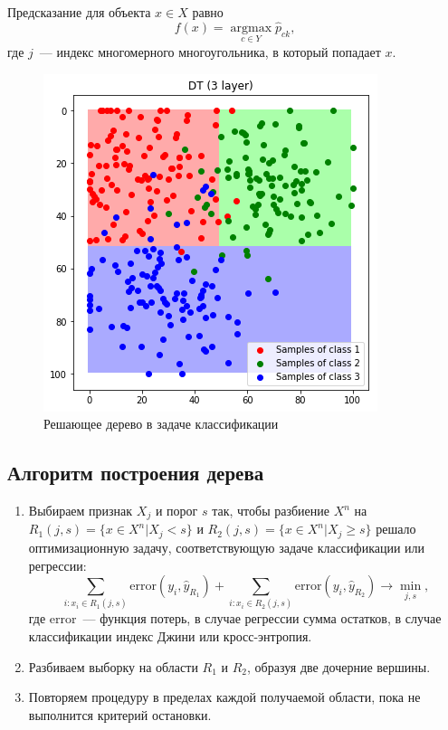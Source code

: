 \documentclass{article}
\DeclareMathOperator*{\argmax}{argmax}
\theoremstyle{definition}
\theoremstyle{theorem}
\theoremstyle{remark}
\theoremstyle{theorem}
\theoremstyle{example}
\theoremstyle{theorem}
\theoremstyle{theorem}
\theoremstyle{theorem}
\theoremstyle{theorem}
\begin{document}
		Предсказание для объекта $x\in X$ равно $$f(x)=\argmax\limits_{c\in Y}\widehat{p}_{ck},$$ где $j$~--- индекс многомерного многоугольника, в который попадает $x$.
		
		\begin{figure}[h!]
		\includegraphics[width=\textwidth]{class_tree1}\caption{Решающее дерево в задаче классификации}		
		\end{figure}
	\subsection{Алгоритм построения дерева}
		\begin{enumerate}
			\item Выбираем признак $X_j$ и порог $s$ так, чтобы разбиение $X^n$ на\\$R_1(j,s) = \{x \in X^n | X_j <s\}$ и $R_2(j,s) = \{x \in X^n | X_j \ge s\}$ решало оптимизационную задачу, соответствующую задаче классификации или регрессии:
$$\sum\limits_{i: x_i \in R_1(j,s)}\mathrm{error}(y_i,\hat{y}_{R_1}) + \sum\limits_{i: x_i \in R_2(j,s)}\mathrm{error}(y_i,\hat{y}_{R_2}) \to \min\limits_{j,s},$$
где $\mathrm{error}$~--- функция потерь, в случае регрессии сумма остатков, в случае классификации индекс Джини или кросс-энтропия.
\item Разбиваем выборку на области $R_1$ и $R_2$, образуя две дочерние вершины.
\item Повторяем процедуру в пределах каждой получаемой области, пока не выполнится критерий остановки.
\end{enumerate}
\end{document}

